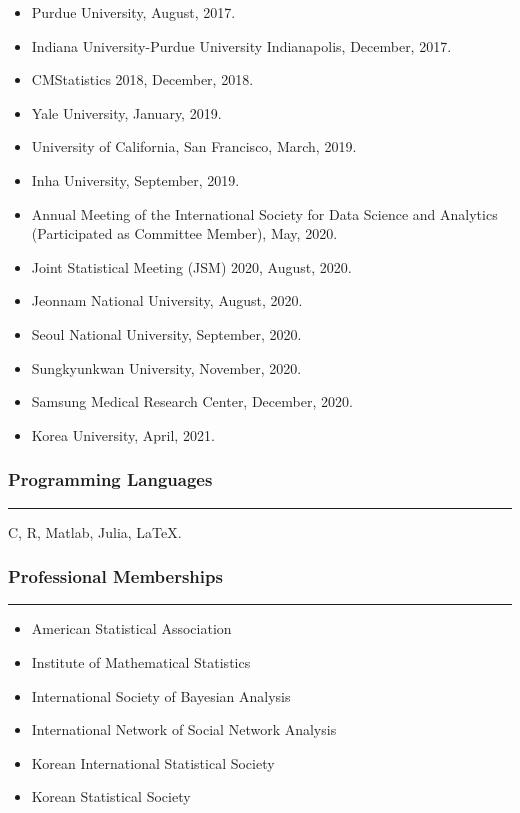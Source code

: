 \documentclass[
]{book}
\providecommand{\tightlist}{%
  \setlength{\itemsep}{0pt}\setlength{\parskip}{0pt}}
\begin{document}
\begin{itemize}
\item
  Purdue University, August, 2017.
\item
  Indiana University-Purdue University Indianapolis, December, 2017.
\item
  CMStatistics 2018, December, 2018.
\item
  Yale University, January, 2019.
\item
  University of California, San Francisco, March, 2019.
\item
  Inha University, September, 2019.
\item
  Annual Meeting of the International Society for Data Science and Analytics (Participated as Committee Member), May, 2020.
\item
  Joint Statistical Meeting (JSM) 2020, August, 2020.
\item
  Jeonnam National University, August, 2020.
\item
  Seoul National University, September, 2020.
\item
  Sungkyunkwan University, November, 2020.
\item
  Samsung Medical Research Center, December, 2020.
\item
  Korea University, April, 2021.
\end{itemize}

\hypertarget{programming-languages}{%
\subsubsection*{Programming Languages}\label{programming-languages}}

\begin{center}\rule{0.5\linewidth}{0.5pt}\end{center}

C, R, Matlab, Julia, LaTeX.

\hypertarget{professional-memberships}{%
\subsubsection*{Professional Memberships}\label{professional-memberships}}

\begin{center}\rule{0.5\linewidth}{0.5pt}\end{center}

\begin{itemize}
\tightlist
\item
  American Statistical Association
\item
  Institute of Mathematical Statistics
\item
  International Society of Bayesian Analysis
\item
  International Network of Social Network Analysis
\item
  Korean International Statistical Society
\item
  Korean Statistical Society
\end{itemize}
\end{document}
